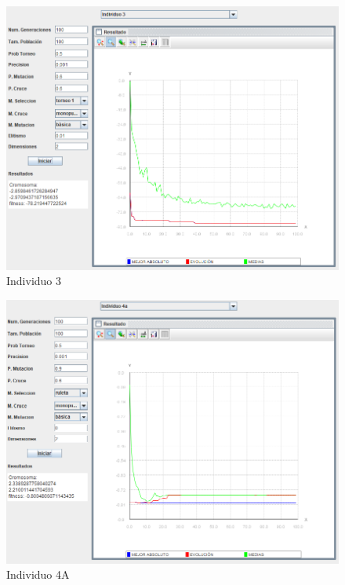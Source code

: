 \documentclass[twoside]{AiTeX}
\begin{document}
\begin{figure}[H]
    \centering
    \includegraphics[width = \textwidth]{Images/Individuo3.png}
    \caption{Individuo 3}
\end{figure}

\begin{figure}[H]
    \centering
    \includegraphics[width = \textwidth]{Images/Individuo4a.png}
    \caption{Individuo 4A}
\end{figure}
\end{document}
